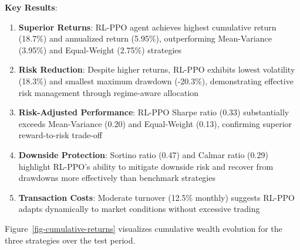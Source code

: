 \documentclass[
  10pt,
  a4paper,
]{article}
\begin{document}
\textbf{Key Results}:

\begin{enumerate}
\def\labelenumi{\arabic{enumi}.}
\item
  \textbf{Superior Returns}: RL-PPO agent achieves highest cumulative
  return (18.7\%) and annualized return (5.95\%), outperforming
  Mean-Variance (3.95\%) and Equal-Weight (2.75\%) strategies
\item
  \textbf{Risk Reduction}: Despite higher returns, RL-PPO exhibits
  lowest volatility (18.3\%) and smallest maximum drawdown (-20.3\%),
  demonstrating effective risk management through regime-aware
  allocation
\item
  \textbf{Risk-Adjusted Performance}: RL-PPO Sharpe ratio (0.33)
  substantially exceeds Mean-Variance (0.20) and Equal-Weight (0.13),
  confirming superior reward-to-risk trade-off
\item
  \textbf{Downside Protection}: Sortino ratio (0.47) and Calmar ratio
  (0.29) highlight RL-PPO's ability to mitigate downside risk and
  recover from drawdowns more effectively than benchmark strategies
\item
  \textbf{Transaction Costs}: Moderate turnover (12.5\% monthly)
  suggests RL-PPO adapts dynamically to market conditions without
  excessive trading
\end{enumerate}

Figure~\ref{fig-cumulative-returns} visualizes cumulative wealth
evolution for the three strategies over the test period.
\end{document}
